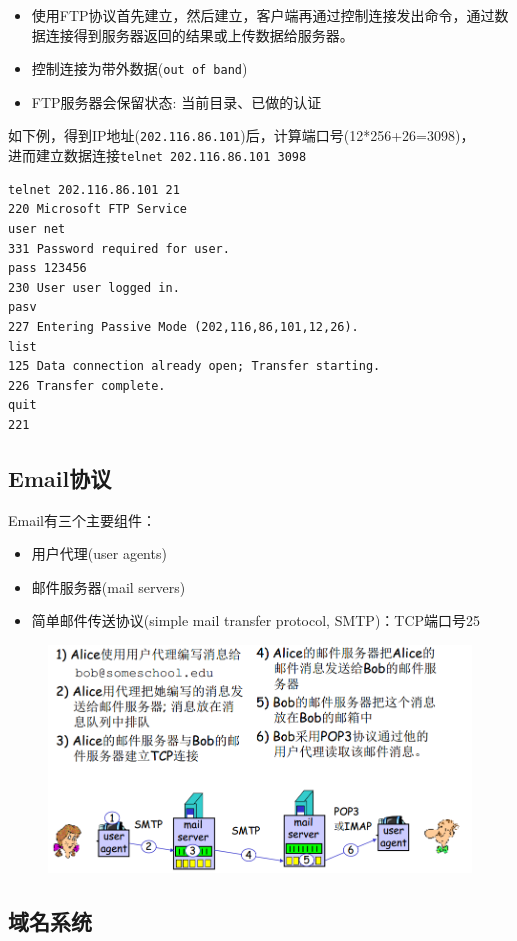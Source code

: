 \begin{itemize}
\item 使用FTP协议首先建立，然后建立，客户端再通过控制连接发出命令，通过数据连接得到服务器返回的结果或上传数据给服务器。
\item 控制连接为带外数据(\verb'out of band')
\item FTP服务器会保留状态: 当前目录、已做的认证
\end{itemize}

如下例，得到IP地址(\verb'202.116.86.101')后，计算端口号(12*256+26=3098)，\\
进而建立数据连接\verb'telnet 202.116.86.101 3098'
\begin{lstlisting}
telnet 202.116.86.101 21
220 Microsoft FTP Service
user net
331 Password required for user.
pass 123456
230 User user logged in.
pasv
227 Entering Passive Mode (202,116,86,101,12,26).
list
125 Data connection already open; Transfer starting.
226 Transfer complete.
quit
221
\end{lstlisting}

\subsection{Email协议}
Email有三个主要组件：
\begin{itemize}
\item 用户代理(user agents)
\item 邮件服务器(mail servers)
\item 简单邮件传送协议(simple mail transfer protocol, SMTP)：TCP端口号25
\end{itemize}
\begin{figure}[H]
\centering
\includegraphics[width=0.7\linewidth]{fig/SMTP.png}
\end{figure}

\subsection{域名系统}
